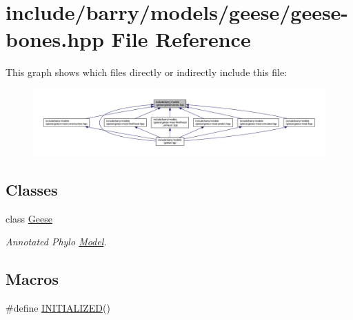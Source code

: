 \hypertarget{geese-bones_8hpp}{}\section{include/barry/models/geese/geese-\/bones.hpp File Reference}
\label{geese-bones_8hpp}
This graph shows which files directly or indirectly include this file\+:\nopagebreak
\begin{figure}[H]
\begin{center}
\leavevmode
\includegraphics[width=350pt]{geese-bones_8hpp__dep__incl}
\end{center}
\end{figure}
\subsection*{Classes}
\begin{DoxyCompactItemize}
\item 
class \hyperlink{class_geese}{Geese}
\begin{DoxyCompactList}\small\item\em Annotated Phylo \hyperlink{class_model}{Model}. \end{DoxyCompactList}\end{DoxyCompactItemize}
\subsection*{Macros}
\begin{DoxyCompactItemize}
\item 
\#define \hyperlink{geese-bones_8hpp_a08888c91f4cab1da64c8f8bf10b59c40}{I\+N\+I\+T\+I\+A\+L\+I\+Z\+ED}()
\end{DoxyCompactItemize}
